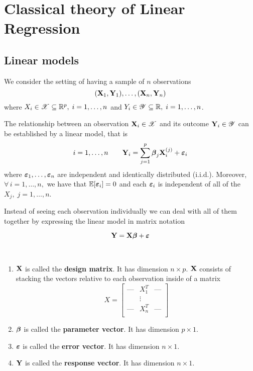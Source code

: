 \chapter{Classical theory of Linear Regression}

\section{Linear models}

We consider the setting of having a sample of $n$ observations
\[
    (\mathbf{X}_1, \mathbf{Y}_1), \ldots ,(\mathbf{X}_n, \mathbf{Y}_n)
\]
where $X_i \in \mathscr{X} \subseteq \mathbb{R}^p, \; i = 1, \ldots, n$ and $Y_i \in \mathscr{Y} \subseteq \mathbb{R}, \; i = 1, \ldots, n$.

\begin{definition}
    The relationship between an observation $\mathbf{X}_i \in \mathscr{X}$ and its outcome $\mathbf{Y}_i \in \mathscr{Y}$ can be established by a linear model, that is
    \begin{equation}
        i = 1, \ldots, n \qquad \mathbf{Y}_{i} = \sum_{j=1}^{p} \boldsymbol{\beta}_{j} \mathbf{X}_{i}^{(j)} + \boldsymbol{\varepsilon}_{i}
    \end{equation}
    where \(\boldsymbol{\varepsilon}_1, \ldots, \boldsymbol{\varepsilon}_n\) are independent and identically distributed (i.i.d.). Moreover, \(\forall \, i = 1, \ldots, n, \) we have that \( \mathbb{E} [\boldsymbol{\varepsilon}_i] = 0\) and each \(\boldsymbol{\varepsilon}_i\) is independent of all of the \( X_j, \; j=1, \ldots, n \).
\end{definition}

Instead of seeing each observation individually we can deal with all of them together by expressing the linear model in matrix notation

\begin{equation}
    \label{eqn: linear model (matrix)}
    \mathbf{Y} = \mathbf{X} \boldsymbol{\beta} + \boldsymbol{\varepsilon}
\end{equation}

\begin{definition}\
    \begin{enumerate}[label=(\alph*)]
        \item $\mathbf{X}$ is called the \textbf{design matrix}. It has dimension $n \times p$. $\mathbf{X}$ consists of stacking the vectors relative to each observation inside of a matrix
              \[
                  X =
                  \begin{bmatrix}
                      \text{---} & X_1^T  & \text{---} \\
                                 & \vdots &            \\
                      \text{---} & X_n^T  & \text{---} \\
                  \end{bmatrix}
              \]
        \item $\boldsymbol{\beta}$ is called the \textbf{parameter vector}. It has dimension $p \times 1$.
        \item $\boldsymbol{\varepsilon}$ is called the \textbf{error vector}. It has dimension $n \times 1$.
        \item $\mathbf{Y}$ is called the \textbf{response vector}. It has dimension $n \times 1$.
    \end{enumerate}
\end{definition}

